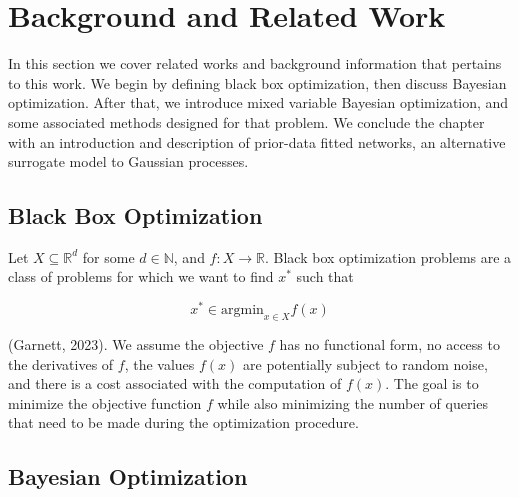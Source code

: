 \documentclass[12pt,twoside]{reedthesis}
\begin{document}
\hypertarget{background}{%
\chapter{Background and Related Work}\label{background}}

In this section we cover related works and background information that pertains to this work. We begin by defining black box optimization, then discuss Bayesian optimization. After that, we introduce mixed variable Bayesian optimization, and some associated methods designed for that problem. We conclude the chapter with an introduction and description of prior-data fitted networks, an alternative surrogate model to Gaussian processes.

\hypertarget{black-box-optimization}{%
\section{Black Box Optimization}\label{black-box-optimization}}

Let \(X\subseteq\mathbb{R}^d\) for some \(d\in\mathbb{N}\), and \(f:X\to\mathbb{R}\). Black box optimization problems are a class of problems for which we want to find \(x^*\) such that

\[x^*\in\text{argmin}_{x\in X}f(x)\]

(Garnett, 2023). We assume the objective \(f\) has no functional form, no access to the derivatives of \(f\), the values \(f(x)\) are potentially subject to random noise, and there is a cost associated with the computation of \(f(x)\). The goal is to minimize the objective function \(f\) while also minimizing the number of queries that need to be made during the optimization procedure.

\hypertarget{bayesian-optimization}{%
\section{Bayesian Optimization}\label{bayesian-optimization}}
\end{document}
